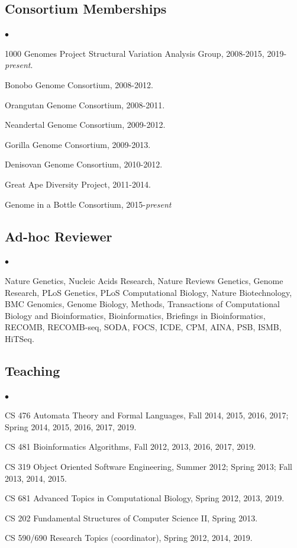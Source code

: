 \documentclass[margin,line]{res}
\newenvironment{list2}{
  \begin{list}{$\bullet$}{%
      \setlength{\itemsep}{0.1cm}
      \setlength{\parsep}{0in} \setlength{\parskip}{0in}
      \setlength{\topsep}{0in} \setlength{\partopsep}{0in} 
      \setlength{\leftmargin}{0.2in}}}{\end{list}}
\begin{document}
\begin{resume}
\vspace{-0.4cm}
\subsection{\small \sc Consortium Memberships}

\begin{list2}
\item
  1000 Genomes Project Structural Variation Analysis Group, 2008-2015, 2019-\textit{present}.
\item
  Bonobo Genome Consortium, 2008-2012.
\item
  Orangutan Genome Consortium, 2008-2011.
\item
  Neandertal Genome Consortium, 2009-2012.
\item
  Gorilla Genome Consortium, 2009-2013.
\item
  Denisovan Genome Consortium, 2010-2012.
\item
  Great Ape Diversity Project, 2011-2014.
\item
  Genome in a Bottle Consortium, 2015-{\it present}
\end{list2}


\vspace{-0.4cm}
\subsection{\small \sc Ad-hoc Reviewer}
\begin{list2}
\item
  Nature Genetics, Nucleic Acids Research, Nature Reviews Genetics, Genome Research, PLoS Genetics, PLoS Computational Biology, 
  Nature Biotechnology, BMC Genomics, Genome Biology, Methods, Transactions of Computational Biology and Bioinformatics,
  Bioinformatics, Briefings in Bioinformatics, RECOMB, RECOMB-seq, SODA, FOCS, ICDE, CPM, AINA, PSB, ISMB, HiTSeq.
\end{list2}

\vspace{-0.4cm}
\subsection{\small \sc Teaching}
\begin{list2}
  \item CS 476 Automata Theory and Formal Languages, Fall 2014, 2015, 2016, 2017; Spring 2014, 2015, 2016, 2017, 2019. 
  \item CS 481 Bioinformatics Algorithms, Fall 2012, 2013, 2016, 2017, 2019.
  \item CS 319 Object Oriented Software Engineering, Summer 2012; Spring 2013; Fall 2013, 2014, 2015.
  \item CS 681 Advanced Topics in Computational Biology, Spring 2012, 2013, 2019.
  \item CS 202 Fundamental Structures of Computer Science II, Spring 2013.
  \item CS 590/690 Research Topics (coordinator), Spring 2012, 2014, 2019.
\end{list2}



\end{resume}
\end{document}
